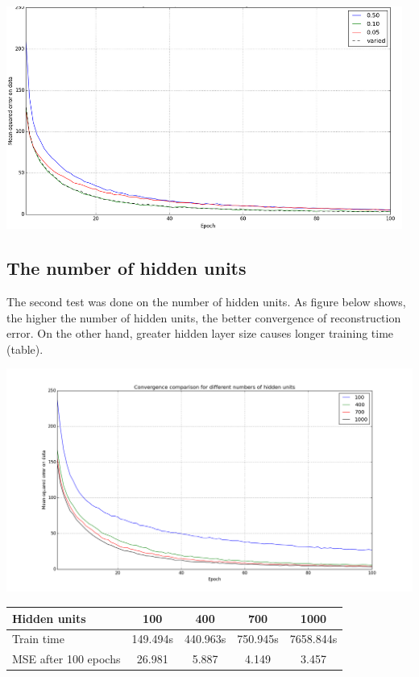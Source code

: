 \documentclass[a4paper]{scrartcl}
\begin{document}
\begin{center}
\includegraphics[width=13cm]{images/lr_var.png}
\end{center}
\subsection{The number of hidden units}
The second test was done on the number of hidden units. As figure below shows, the higher the number of hidden units, the better convergence of reconstruction error. On the other hand, greater hidden layer size causes longer training time (table).
\begin{center}
\includegraphics[width=14cm]{images/hu.png}
\end{center}
\hspace{1cm}
\begin{tabular}{ | l || c | c | c | c | } 
	\hline
	Hidden units & 100 & 400 & 700 & 1000 \\ \hline
	Train time & 149.494s & 440.963s & 750.945s & 7658.844s \\ \hline
	MSE after 100 epochs & 26.981 & 5.887 & 4.149 & 3.457\\ 
	\hline 
\end{tabular}
\end{document}
